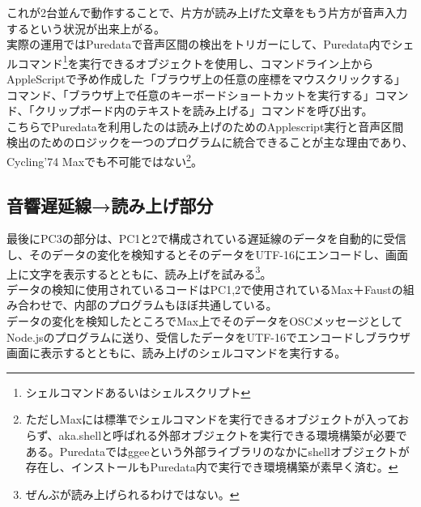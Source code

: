 \documentclass[a4paper,report]{jsbook}
\begin{document}
これが2台並んで動作することで、片方が読み上げた文章をもう片方が音声入力するという状況が出来上がる。\\
実際の運用ではPuredataで音声区間の検出をトリガーにして、Puredata内でシェルコマンド\footnote{シェルコマンドあるいはシェルスクリプト}を実行できるオブジェクトを使用し、コマンドライン上からAppleScriptで予め作成した「ブラウザ上の任意の座標をマウスクリックする」コマンド、「ブラウザ上で任意のキーボードショートカットを実行する」コマンド、「クリップボード内のテキストを読み上げる」コマンドを呼び出す。\\
こちらでPuredataを利用したのは読み上げのためのApplescript実行と音声区間検出のためのロジックを一つのプログラムに統合できることが主な理由であり、Cycling'74
Maxでも不可能ではない\footnote{ただしMaxには標準でシェルコマンドを実行できるオブジェクトが入っておらず、aka.shellと呼ばれる外部オブジェクトを実行できる環境構築が必要である。Puredataではggeeという外部ライブラリのなかにshellオブジェクトが存在し、インストールもPuredata内で実行でき環境構築が素早く済む。}。

\subsection{音響遅延線→読み上げ部分}\label{ux97f3ux97ffux9045ux5ef6ux7ddaux8aadux307fux4e0aux3052ux90e8ux5206}

最後にPC3の部分は、PC1と2で構成されている遅延線のデータを自動的に受信し、そのデータの変化を検知するとそのデータをUTF-16にエンコードし、画面上に文字を表示するとともに、読み上げを試みる\footnote{ぜんぶが読み上げられるわけではない。}。\\
データの検知に使用されているコードはPC1,2で使用されているMax＋Faustの組み合わせで、内部のプログラムもほぼ共通している。\\
データの変化を検知したところでMax上でそのデータをOSCメッセージとしてNode.jsのプログラムに送り、受信したデータをUTF-16でエンコードしブラウザ画面に表示するとともに、読み上げのシェルコマンドを実行する。
\end{document}
